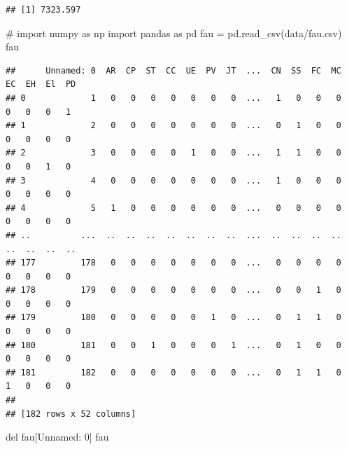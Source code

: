 \documentclass[
  10pt,
]{article}
\newenvironment{Shaded}{\begin{snugshade}}{\end{snugshade}}
\newcommand{\NormalTok}[1]{#1}
\begin{document}
\begin{verbatim}
## [1] 7323.597
\end{verbatim}

\begin{Shaded}
\end{Shaded}

\begin{Shaded}
\begin{Highlighting}[]
\NormalTok{\# import numpy as np }
\NormalTok{import pandas as pd}
\NormalTok{fau = pd.read\_csv(\textquotesingle{}data/fau.csv\textquotesingle{})}
\NormalTok{fau}
\end{Highlighting}
\end{Shaded}

\begin{verbatim}
##      Unnamed: 0  AR  CP  ST  CC  UE  PV  JT  ...  CN  SS  FC  MC  EC  EH  El  PD
## 0             1   0   0   0   0   0   0   0  ...   1   0   0   0   0   0   0   1
## 1             2   0   0   0   0   0   0   0  ...   0   1   0   0   0   0   0   0
## 2             3   0   0   0   0   1   0   0  ...   1   1   0   0   0   0   1   0
## 3             4   0   0   0   0   0   0   0  ...   1   0   0   0   0   0   0   0
## 4             5   1   0   0   0   0   0   0  ...   0   0   0   0   0   0   0   0
## ..          ...  ..  ..  ..  ..  ..  ..  ..  ...  ..  ..  ..  ..  ..  ..  ..  ..
## 177         178   0   0   0   0   0   0   0  ...   0   0   0   0   0   0   0   0
## 178         179   0   0   0   0   0   0   0  ...   0   0   1   0   0   0   0   0
## 179         180   0   0   0   0   0   1   0  ...   0   1   1   0   0   0   0   0
## 180         181   0   0   1   0   0   0   1  ...   0   1   0   0   0   0   0   0
## 181         182   0   0   0   0   0   0   0  ...   0   1   1   0   1   0   0   0
## 
## [182 rows x 52 columns]
\end{verbatim}

\begin{Shaded}
\begin{Highlighting}[]
\NormalTok{del fau[\textquotesingle{}Unnamed: 0\textquotesingle{}]}
\NormalTok{fau}
\end{Highlighting}
\end{Shaded}
\end{document}
